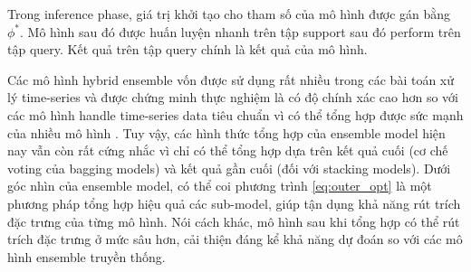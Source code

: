 \documentclass[aps,prb,groupedaddress,twocolumn,showpacs,dvipdfmx,superscriptaddress,pdftex]{revtex4-2}
\begin{document}

\vspace{2mm}

Trong inference phase, giá trị khởi tạo cho tham số của mô hình được gán bằng $\phi^*$. Mô hình sau đó được huấn luyện nhanh trên tập support sau đó perform trên tập query. Kết quả trên tập query chính là kết quả của mô hình.


\vspace{2mm}

Các mô hình hybrid ensemble vốn được sử dụng rất nhiều trong các bài toán xử lý time-series và được chứng minh thực nghiệm là có độ chính xác cao hơn so với các mô hình handle time-series data tiêu chuẩn vì có thể tổng hợp được sức mạnh của nhiều mô hình \cite{ayitey2023forex}. Tuy vậy, các hình thức tổng hợp của ensemble model hiện nay vẫn còn rất cứng nhắc vì chỉ có thể tổng hợp dựa trên kết quả cuối (cơ chế voting của bagging models) và kết quả gần cuối (đối với stacking models). Dưới góc nhìn của ensemble model, có thể coi phương trình \ref{eq:outer_opt} là một phương pháp tổng hợp hiệu quả các sub-model, giúp tận dụng khả năng rút trích đặc trưng của từng mô hình. Nói cách khác, mô hình sau khi tổng hợp có thể rút trích đặc trưng ở mức sâu hơn, cải thiện đáng kể khả năng dự đoán so với các mô hình ensemble truyền thống.

\end{document}
